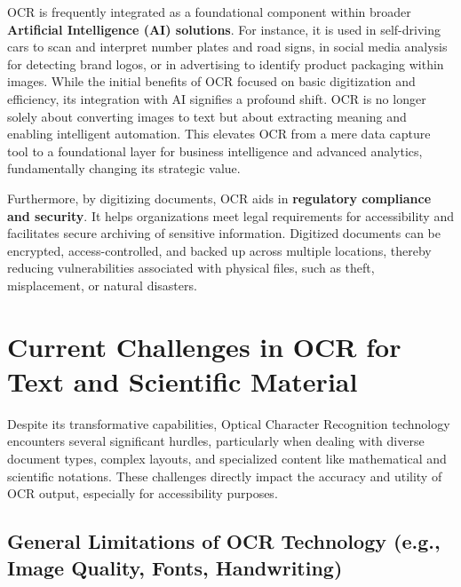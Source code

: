 OCR is frequently integrated as a foundational component within broader \textbf{Artificial Intelligence (AI) solutions}. For instance, it is used in self-driving cars to scan and interpret number plates and road signs, in social media analysis for detecting brand logos, or in advertising to identify product packaging within images. While the initial benefits of OCR focused on basic digitization and efficiency, its integration with AI signifies a profound shift. OCR is no longer solely about converting images to text but about extracting meaning and enabling intelligent automation. This elevates OCR from a mere data capture tool to a foundational layer for business intelligence and advanced analytics, fundamentally changing its strategic value.

Furthermore, by digitizing documents, OCR aids in \textbf{regulatory compliance and security}. It helps organizations meet legal requirements for accessibility and facilitates secure archiving of sensitive information. Digitized documents can be encrypted, access-controlled, and backed up across multiple locations, thereby reducing vulnerabilities associated with physical files, such as theft, misplacement, or natural disasters.

\section{Current Challenges in OCR for Text and Scientific Material}

Despite its transformative capabilities, Optical Character Recognition technology encounters several significant hurdles, particularly when dealing with diverse document types, complex layouts, and specialized content like mathematical and scientific notations. These challenges directly impact the accuracy and utility of OCR output, especially for accessibility purposes.

\subsection{General Limitations of OCR Technology (e.g., Image Quality, Fonts, Handwriting)}

